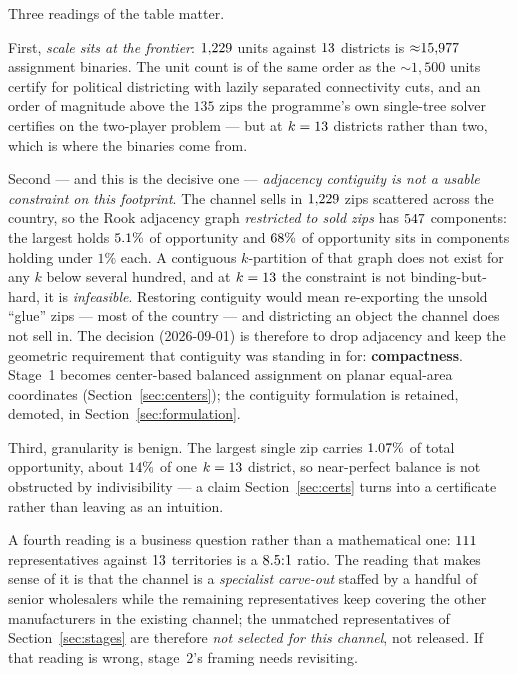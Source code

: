\documentclass[11pt]{article}
\theoremstyle{definition}
\begin{document}
Three readings of the table matter.

First, \emph{scale sits at the frontier}: $1{,}229$ units against $13$ districts is
${\approx}15{,}977$ assignment binaries. The unit count is of the same order as the
${\sim}1{,}500$ units \citet{validibuchanan2022} certify for political districting with
lazily separated connectivity cuts, and an order of magnitude above the $135$ zips the
programme's own single-tree solver certifies on the two-player problem --- but at
$k=13$ districts rather than two, which is where the binaries come from.

Second --- and this is the decisive one --- \emph{adjacency contiguity is not a usable
constraint on this footprint}. The channel sells in $1{,}229$ zips scattered across the
country, so the Rook adjacency graph \emph{restricted to sold zips} has
$547$ components: the largest holds $5.1\%$ of opportunity and
$68\%$ of opportunity sits in components holding under $1\%$ each. A contiguous
$k$-partition of that graph does not exist for any $k$ below several hundred, and at
$k=13$ the constraint is not binding-but-hard, it is \emph{infeasible}. Restoring
contiguity would mean re-exporting the unsold ``glue'' zips --- most of the country --- and
districting an object the channel does not sell in. The decision (2026-09-01) is therefore
to drop adjacency and keep the geometric requirement that contiguity was standing in for:
\textbf{compactness}. Stage~1 becomes center-based balanced assignment on planar equal-area
coordinates (Section~\ref{sec:centers}); the contiguity formulation is retained, demoted, in
Section~\ref{sec:formulation}.

Third, granularity is benign. The largest single zip carries $1.07\%$ of total
opportunity, about $14\%$ of one $k=13$ district, so
near-perfect balance is not obstructed by indivisibility --- a claim Section~\ref{sec:certs}
turns into a certificate rather than leaving as an intuition.

A fourth reading is a business question rather than a mathematical one: $111$
representatives against $13$ territories is a $8.5{:}1$ ratio. The reading
that makes sense of it is that the channel is a \emph{specialist carve-out} staffed by a
handful of senior wholesalers while the remaining representatives keep covering the other
manufacturers in the existing channel; the unmatched representatives of
Section~\ref{sec:stages} are therefore \emph{not selected for this channel}, not released.
If that reading is wrong, stage~2's framing needs revisiting.
\end{document}

